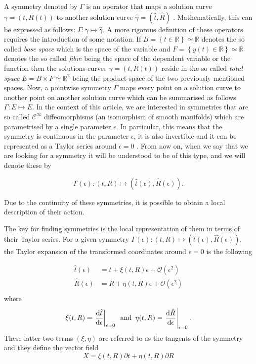 A symmetry denoted by $\Gamma$ is an operator that maps a solution curve $\gamma=(t,R(t))$ to another solution curve $\hat{\gamma}=(\hat{t},\hat{R})$ \cite{hydon2000symmetry}. Mathematically, this can be expressed as follows: $\Gamma:\gamma\mapsto\hat{\gamma}$. A more rigorous definition of these operators requires the introduction of some notation. If $B=\left\{t\in\mathbb{R}\right\}\simeq\mathbb{R}$ denotes the so called \textit{base space} which is the space of the variable and $F=\left\{y(t)\in\mathbb{R}\right\}\simeq\mathbb{R}$ denotes the so called \textit{fibre} being the space of the dependent variable or the function then the solutions curves $\gamma=(t,R(t))$ reside in the so called \textit{total space} $E=B\times F\simeq\mathbb{R}^2$ being the product space of the two previously mentioned spaces. Now, a pointwise symmetry $\Gamma$ maps every point on a solution curve to another point on another solution curve which can be summarised as follows $\Gamma:E\mapsto E$. In the context of this article, we are interested in symmetries that are so called $\mathcal{C}^\infty$ diffeomorphisms (an isomorphism of smooth manifolds) which are parametrised by a single parameter $\epsilon$. In particular, this means that the symmetry is continuous in the parameter $\epsilon$, it is also invertible and it can be represented as a Taylor series around $\epsilon=0$ \cite{hydon2000symmetry}. From now on, when we say that we are looking for a symmetry it will be understood to be of this type, and we will denote these by

$$\Gamma (\epsilon):(t,R)\mapsto(\hat{t}(\epsilon),\hat{R}(\epsilon)).$$

Due to the continuity of these symmetries, it is possible to obtain a local description of their action.

The key for finding symmetries is the local representation of them in terms of their Taylor series. For a given symmetry $\Gamma (\epsilon):(t,R)\mapsto(\hat{t}(\epsilon),\hat{R}(\epsilon))$, the Taylor expansion of the transformed coordinates around $\epsilon=0$ is the following

\begin{align*}
\hat{t}(\epsilon)&=t+\xi(t,R)\epsilon+\mathcal{O}\left(\epsilon^2\right)\\
\hat{R}(\epsilon)&=R+\eta(t,R)\epsilon+\mathcal{O}\left(\epsilon^2\right)\\
\end{align*}
where
$$\xi(t,R)=\left.\dv{\hat{t}}{\epsilon}\right|_{\epsilon=0}\;\;\mathrm{and}\;\;\eta(t,R)=\left.\dv{\hat{R}}{\epsilon}\right|_{\epsilon=0}.$$
These latter two terms $\left(\xi,\eta\right)$ are referred to as the tangents of the symmetry and they define the vector field
\begin{equation}
  X=\xi(t,R)\partial t+\eta(t,R)\partial R
  \label{eq:generator}
\end{equation}

